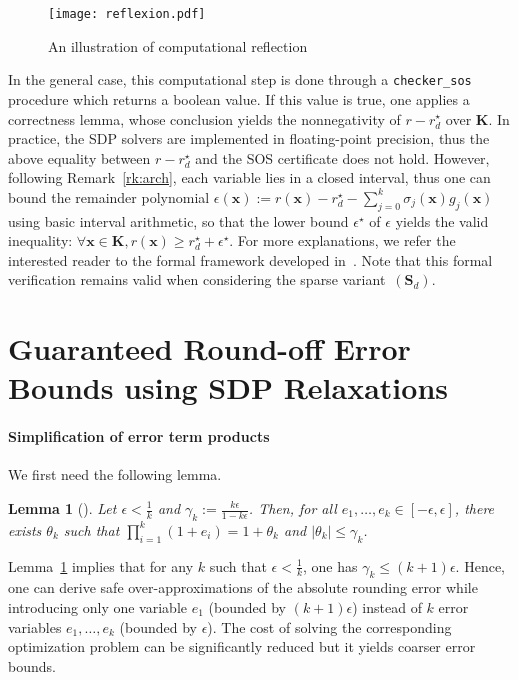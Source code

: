 \documentclass[preprint]{sigplanconf}
\newcommand{\code}[1]{\lstinline{#1}}
\newcommand{\x}{\mathbf{x}}
\def\S{\mathbf{S}}
\def\K{\mathbf{K}}
\def\S{\mathbf{S}}
\newtheorem{lemma}[theorem]{Lemma}
\theoremstyle{plain}
\begin{document}
\fi
%
\begin{figure}[!ht]
\centering
\texttt{[image: reflexion.pdf]}
\caption{An illustration of computational reflection}	
\label{fig:reflexion}
\end{figure}
%
In the general case, this computational step is done through a \code{checker_sos} procedure which returns a boolean value. If this value is true, one applies a correctness lemma, whose conclusion yields the nonnegativity of $r - r_d^\star$ over $\K$.
In practice, the SDP solvers are implemented in floating-point precision, thus the above equality between $r - r_d^\star$ and the SOS certificate does not hold. However, following Remark~\ref{rk:arch}, each variable lies in a closed interval, thus one can bound the remainder polynomial $\epsilon(\x) := r(\x) - r_d^\star - \sum_{j=0}^k \sigma_j(\x) g_j(\x)$ using basic interval arithmetic, so that the lower bound $\epsilon^\star$ of $\epsilon$ yields the valid inequality: $\forall \x \in \K, r(\x) \geq r_d^\star + \epsilon^\star$.
For more explanations, we refer the interested reader to the formal framework developed in~\cite{jfr14}. Note that this formal verification remains valid when considering the sparse variant~$(\S_d)$.
%
\section{Guaranteed Round-off Error Bounds using SDP Relaxations}
\label{sec:fpsdp}

\paragraph{Simplification of error term products}
We first need the following lemma.
\begin{lemma}[]
\label{th:redproduct}
Let $\epsilon < \frac{1}{k}$ and $\gamma_k := \frac{k \epsilon}{1 - k \epsilon}$. Then, for all $e_1, \dots, e_k \in [-\epsilon, \epsilon]$, there exists $\theta_k$ such that ${\displaystyle \prod_{i=1}^k (1 + e_i) = 1 + \theta_k}$ and $\mid \theta_k \mid \leq \gamma_k$.
\end{lemma}
%
Lemma~\ref{th:redproduct} implies that for any $k$ such that $\epsilon < \frac{1}{k}$, one has $\gamma_k \leq (k + 1) \epsilon$. Hence, one can derive safe over-approximations of the absolute rounding error while introducing only one variable $e_1$ (bounded by $(k + 1) \epsilon$) instead of $k$ error variables $e_1, \dots, e_k$ (bounded by $\epsilon$). The cost of solving the corresponding optimization problem can be significantly reduced but it yields coarser error bounds.
\end{document}
